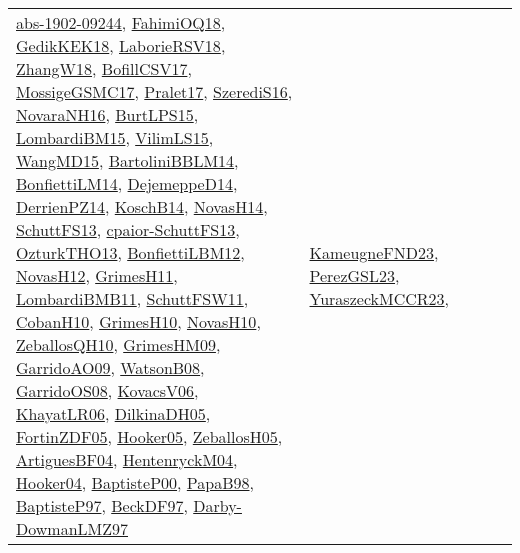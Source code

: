 {\begin{longtable}{llp{6cm}p{6cm}p{6cm}}
\href{articles/abs-1902-09244.pdf}{abs-1902-09244}\cite{abs-1902-09244}, \href{articles/FahimiOQ18.pdf}{FahimiOQ18}\cite{FahimiOQ18}, \href{articles/GedikKEK18.pdf}{GedikKEK18}\cite{GedikKEK18}, \href{articles/LaborieRSV18.pdf}{LaborieRSV18}\cite{LaborieRSV18}, \href{articles/ZhangW18.pdf}{ZhangW18}\cite{ZhangW18}, \href{papers/BofillCSV17.pdf}{BofillCSV17}\cite{BofillCSV17}, \href{papers/MossigeGSMC17.pdf}{MossigeGSMC17}\cite{MossigeGSMC17}, \href{papers/Pralet17.pdf}{Pralet17}\cite{Pralet17}, \href{papers/SzerediS16.pdf}{SzerediS16}\cite{SzerediS16}, \href{articles/NovaraNH16.pdf}{NovaraNH16}\cite{NovaraNH16}, \href{papers/BurtLPS15.pdf}{BurtLPS15}\cite{BurtLPS15}, \href{papers/LombardiBM15.pdf}{LombardiBM15}\cite{LombardiBM15}, \href{papers/VilimLS15.pdf}{VilimLS15}\cite{VilimLS15}, \href{articles/WangMD15.pdf}{WangMD15}\cite{WangMD15}, \href{papers/BartoliniBBLM14.pdf}{BartoliniBBLM14}\cite{BartoliniBBLM14}, \href{papers/BonfiettiLM14.pdf}{BonfiettiLM14}\cite{BonfiettiLM14}, \href{papers/DejemeppeD14.pdf}{DejemeppeD14}\cite{DejemeppeD14}, \href{papers/DerrienPZ14.pdf}{DerrienPZ14}\cite{DerrienPZ14}, \href{papers/KoschB14.pdf}{KoschB14}\cite{KoschB14}, \href{articles/NovasH14.pdf}{NovasH14}\cite{NovasH14}, \href{papers/SchuttFS13.pdf}{SchuttFS13}\cite{SchuttFS13}, \href{papers/cpaior-SchuttFS13.pdf}{cpaior-SchuttFS13}\cite{cpaior-SchuttFS13}, \href{articles/OzturkTHO13.pdf}{OzturkTHO13}\cite{OzturkTHO13}, \href{papers/BonfiettiLBM12.pdf}{BonfiettiLBM12}\cite{BonfiettiLBM12}, \href{articles/NovasH12.pdf}{NovasH12}\cite{NovasH12}, \href{papers/GrimesH11.pdf}{GrimesH11}\cite{GrimesH11}, \href{papers/LombardiBMB11.pdf}{LombardiBMB11}\cite{LombardiBMB11}, \href{articles/SchuttFSW11.pdf}{SchuttFSW11}\cite{SchuttFSW11}, \href{papers/CobanH10.pdf}{CobanH10}\cite{CobanH10}, \href{papers/GrimesH10.pdf}{GrimesH10}\cite{GrimesH10}, \href{articles/NovasH10.pdf}{NovasH10}\cite{NovasH10}, \href{articles/ZeballosQH10.pdf}{ZeballosQH10}\cite{ZeballosQH10}, \href{papers/GrimesHM09.pdf}{GrimesHM09}\cite{GrimesHM09}, \href{articles/GarridoAO09.pdf}{GarridoAO09}\cite{GarridoAO09}, \href{papers/WatsonB08.pdf}{WatsonB08}\cite{WatsonB08}, \href{articles/GarridoOS08.pdf}{GarridoOS08}\cite{GarridoOS08}, \href{papers/KovacsV06.pdf}{KovacsV06}\cite{KovacsV06}, \href{articles/KhayatLR06.pdf}{KhayatLR06}\cite{KhayatLR06}, \href{papers/DilkinaDH05.pdf}{DilkinaDH05}\cite{DilkinaDH05}, \href{papers/FortinZDF05.pdf}{FortinZDF05}\cite{FortinZDF05}, \href{articles/Hooker05.pdf}{Hooker05}\cite{Hooker05}, \href{articles/ZeballosH05.pdf}{ZeballosH05}\cite{ZeballosH05}, \href{papers/ArtiguesBF04.pdf}{ArtiguesBF04}\cite{ArtiguesBF04}, \href{papers/HentenryckM04.pdf}{HentenryckM04}\cite{HentenryckM04}, \href{papers/Hooker04.pdf}{Hooker04}\cite{Hooker04}, \href{articles/BaptisteP00.pdf}{BaptisteP00}\cite{BaptisteP00}, \href{articles/PapaB98.pdf}{PapaB98}\cite{PapaB98}, \href{papers/BaptisteP97.pdf}{BaptisteP97}\cite{BaptisteP97}, \href{papers/BeckDF97.pdf}{BeckDF97}\cite{BeckDF97}, \href{articles/Darby-DowmanLMZ97.pdf}{Darby-DowmanLMZ97}\cite{Darby-DowmanLMZ97} & \href{papers/KameugneFND23.pdf}{KameugneFND23}\cite{KameugneFND23}, \href{papers/PerezGSL23.pdf}{PerezGSL23}\cite{PerezGSL23}, \href{articles/YuraszeckMCCR23.pdf}{YuraszeckMCCR23}\cite{YuraszeckMCCR23}, 
\end{longtable}}
